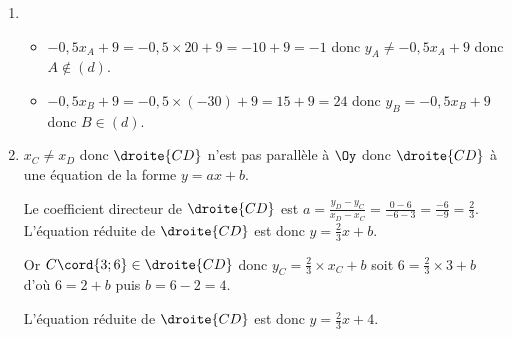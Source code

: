 \setcounter{exm}{2}

\begin{exm}
\begin{enumerate}
\item 
    \begin{itemize}
    \item $-0,5x_A+9=-0,5\times 20 +9=-10+9=-1$ donc $y_A\neq -0,5x_A+9$ donc $A\not\in (d)$.
    \item $-0,5x_B+9=-0,5\times (-30) +9=15+9=24$ donc $y_B = -0,5x_B+9$ donc $B\in (d)$.
    \end{itemize}
\item $x_C \neq x_D$ donc $\droite{CD}$ n'est pas parallèle à $\Oy$ donc $\droite{CD}$ à une équation de la forme $y=ax+b$. 

Le coefficient directeur de $\droite{CD}$ est $a=\frac{y_D-y_C}{x_D-x_C}=\frac{0-6}{-6-3}=\frac{-6}{-9}=\frac{2}{3}$. L'équation réduite de $\droite{CD}$ est donc $y=\frac23x+b$.

Or  $C\cord{3;6}\in\droite{CD}$ donc $y_C=\frac23\times x_C + b$ soit $6 = \frac23 \times 3 + b$ d'où $6 = 2 + b$ puis $b = 6-2 = 4$.

L'équation réduite de $\droite{CD}$ est donc $y = \frac23 x + 4$.
\end{enumerate}
\end{exm}
